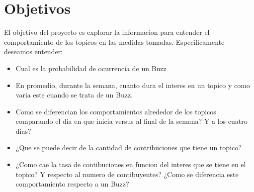 \section{Objetivos}

El objetivo del proyecto es explorar la informacion para entender el
comportamiento de los topicos en las medidas tomadas. Especificamente
deseamos entender:

\begin{itemize}
  \item{Cual es la probabilidad de ocurrencia de un Buzz}
  \item{En promedio, durante la semana, cuanto dura el interes en un topico
  y como varia este cuando se trata de un Buzz.}
  \item{Como se diferencian los comportamientos alrededor de los topicos
  comparando el dia en que inicia versus al final de la semana? Y a los
  cuatro dias?}
  \item{¿Que se puede decir de la cantidad de contribuciones que tiene un
  topico?}
  \item{¿Como cae la tasa de contibuciones en funcion del interes que se
  tiene en el topico? Y respecto al numero de contibuyentes? ¿Como se
  diferencia este comportamiento respecto a un Buzz?}
\end{itemize}
